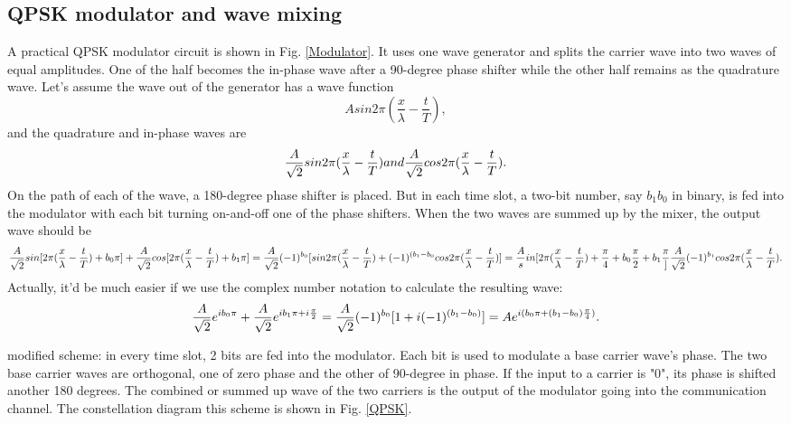 \documentclass[Letter,11pt]{book}
\begin{document}
\subsection{QPSK modulator and wave mixing}\label{modulation}
A practical QPSK modulator circuit is shown in Fig. \ref{Modulator}. It uses one wave generator and splits the carrier wave into two waves of equal amplitudes. One of the half becomes the in-phase wave after a 90-degree phase shifter while the other half remains as the quadrature wave. Let's assume the wave out of the generator has a wave function
\begin{equation}
    A sin 2\pi(\frac x \lambda - \frac t T),
\end{equation}
and the quadrature and in-phase waves are
\begin{equation}
    \frac A {\sqrt 2} sin 2\pi(\frac x \lambda - \frac t T) and \\
    \frac A {\sqrt 2} cos 2\pi(\frac x \lambda - \frac t T).
\end{equation}
On the path of each of the wave, a 180-degree phase shifter is placed. But in each time slot, a two-bit number, say $b_1 b_0$ in binary, is fed into the modulator with each bit turning on-and-off one of the phase shifters. When the two waves are summed up by the mixer, the output wave should be
\begin{equation}
    \frac A {\sqrt 2} sin[2\pi(\frac x \lambda - \frac t T)+b_0 \pi] +
    \frac A {\sqrt 2} cos[2\pi(\frac x \lambda - \frac t T)+b_1 \pi] \\
    =\frac A {\sqrt 2} (-1)^{b_0} [sin 2\pi(\frac x \lambda - \frac t T) +
     (-1)^{(b_1-b_0} cos 2\pi(\frac x \lambda - \frac t T)] \\
    =\frac A sin [2\pi(\frac x \lambda - \frac t T) +\frac \pi 4 +b_0 \frac \pi 2+b_1 \frac \pi]
    \frac A {\sqrt 2} (-1)^{b_1} cos 2\pi(\frac x \lambda - \frac t T).
\end{equation}
Actually, it'd be much easier if we use the complex number notation to calculate the resulting wave:
\begin{equation}
    \frac A {\sqrt 2} e^{i b_0 \pi} + \frac A {\sqrt 2} e^{i b_1 \pi + i \frac \pi 2} \\
    = \frac A {\sqrt 2} (-1)^{b_0}[1+i (-1)^{(b_1-b_0)}]\\
    = A  e^{i(b_0 \pi + (b_1 - b_0) \frac \pi 4)}.
\end{equation}

modified scheme: in every time slot, 2 bits are fed into the modulator. Each bit is used to modulate a base carrier wave's phase. The two base carrier waves are orthogonal, one of zero phase and the other of 90-degree in phase. If the input to a carrier is "0", its phase is shifted another 180 degrees. The combined or summed up wave of the two carriers is the output of the modulator going into the communication channel. The constellation diagram this scheme is shown in Fig. \ref{QPSK}.
\end{document}

